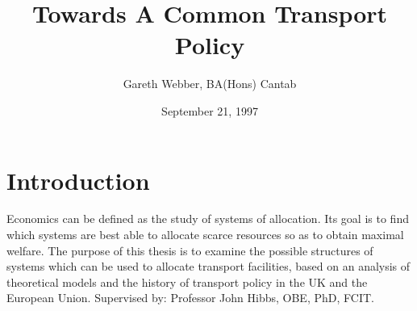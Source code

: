 \documentclass[12pt]{article}
\begin{document}
\title{Towards A Common Transport Policy}
\author{Gareth Webber, BA(Hons) Cantab}
\date{September 21, 1997}

\maketitle

\section{Introduction}
Economics can be defined as the study of systems of allocation. Its goal is to find which systems are best able to allocate scarce resources so as to obtain maximal welfare. The purpose of this thesis is to examine the possible structures of systems which can be used to allocate transport facilities, based on an analysis of theoretical models and the history of transport policy in the UK and the European Union.
Supervised by: Professor John Hibbs, OBE, PhD, FCIT.


\end{document}
